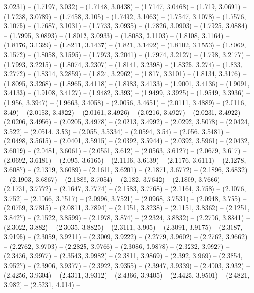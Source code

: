 {  3.0231) -- (1.7197, 3.032) -- (1.7148, 3.0438) -- (1.7147, 3.0468) -- (1.719, 
  3.0691) -- (1.7238, 3.0789) -- (1.7458, 3.105) -- (1.7492, 3.1063) -- (1.7547,
   3.1078) -- (1.7576, 3.1075) -- (1.7687, 3.1031) -- (1.7733, 3.0935) -- 
  (1.7826, 3.0903) -- (1.7925, 3.0884) -- (1.7995, 3.0893) -- (1.8012, 3.0933) 
  -- (1.8083, 3.1103) -- (1.8108, 3.1164) -- (1.8176, 3.1329) -- (1.8211, 
  3.1437) -- (1.821, 3.1492) -- (1.8102, 3.1553) -- (1.8069, 3.1572) -- (1.8058,
   3.1595) -- (1.7973, 3.2041) -- (1.7974, 3.2127) -- (1.798, 3.2177) -- 
  (1.7993, 3.2215) -- (1.8074, 3.2307) -- (1.8141, 3.2398) -- (1.8325, 3.274) --
   (1.833, 3.2772) -- (1.8314, 3.2859) -- (1.824, 3.2962) -- (1.817, 3.3101) -- 
  (1.8134, 3.3176) -- (1.8095, 3.3268) -- (1.8965, 3.4118) -- (1.8983, 3.4133) 
  -- (1.9001, 3.4136) -- (1.9091, 3.4133) -- (1.9108, 3.4127) -- (1.9482, 3.393)
   -- (1.9499, 3.3925) -- (1.9549, 3.3936) -- (1.956, 3.3947) -- (1.9663, 
  3.4058) -- (2.0056, 3.4651) -- (2.0111, 3.4889) -- (2.0116, 3.49) -- (2.0153, 
  3.4922) -- (2.0161, 3.4926) -- (2.0216, 3.4927) -- (2.0231, 3.4922) -- 
  (2.0206, 3.4956) -- (2.0205, 3.4978) -- (2.0213, 3.4992) -- (2.0292, 3.5078) 
  -- (2.0424, 3.522) -- (2.0514, 3.53) -- (2.055, 3.5334) -- (2.0594, 3.54) -- 
  (2.056, 3.5481) -- (2.0498, 3.5615) -- (2.0401, 3.5915) -- (2.0392, 3.5944) --
   (2.0392, 3.5961) -- (2.0432, 3.6019) -- (2.0481, 3.6061) -- (2.0551, 3.612) 
  -- (2.0563, 3.6127) -- (2.0679, 3.617) -- (2.0692, 3.6181) -- (2.095, 3.6165) 
  -- (2.1106, 3.6139) -- (2.1176, 3.6111) -- (2.1278, 3.6087) -- (2.1319, 
  3.6089) -- (2.1611, 3.6201) -- (2.1871, 3.6772) -- (2.1896, 3.6832) -- 
  (2.1903, 3.6867) -- (2.1888, 3.7054) -- (2.182, 3.7642) -- (2.1809, 3.7666) --
   (2.1731, 3.7772) -- (2.1647, 3.7774) -- (2.1583, 3.7768) -- (2.1164, 3.758) 
  -- (2.1076, 3.752) -- (2.1066, 3.7517) -- (2.0996, 3.7521) -- (2.0968, 3.7531)
   -- (2.0948, 3.755) -- (2.0759, 3.7815) -- (2.0811, 3.7894) -- (2.1051, 
  3.8238) -- (2.1151, 3.8362) -- (2.1251, 3.8427) -- (2.1522, 3.8599) -- 
  (2.1978, 3.874) -- (2.2324, 3.8832) -- (2.2706, 3.8841) -- (2.3022, 3.882) -- 
  (2.3035, 3.8825) -- (2.3111, 3.905) -- (2.3091, 3.9175) -- (2.3087, 3.9195) --
   (2.3059, 3.9211) -- (2.3009, 3.9222) -- (2.2779, 3.9602) -- (2.2762, 3.9662) 
  -- (2.2762, 3.9703) -- (2.2825, 3.9766) -- (2.3086, 3.9878) -- (2.3232, 
  3.9927) -- (2.3436, 3.9977) -- (2.3543, 3.9982) -- (2.3811, 3.9869) -- (2.392,
   3.969) -- (2.3854, 3.9527) -- (2.3906, 3.9377) -- (2.3922, 3.9355) -- 
  (2.3947, 3.9339) -- (2.4003, 3.932) -- (2.4256, 3.9304) -- (2.4311, 3.9312) --
   (2.4366, 3.9405) -- (2.4425, 3.9501) -- (2.4821, 3.982) -- (2.5231, 4.014) --
}
